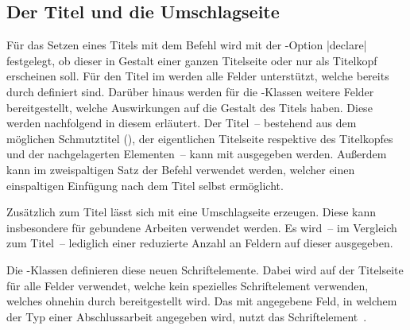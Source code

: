 \begin{Declaration*}{}
\begin{Declaration*}{}
\begin{Declaration*}{}
\subsection{Der Titel und die Umschlagseite}
%
%
%
%
%
Für das Setzen eines Titels mit dem Befehl  wird mit der 
\KOMAScript-Option |declare| festgelegt, ob dieser 
in Gestalt einer ganzen Titelseite oder nur als Titelkopf erscheinen soll. Für 
den Titel im \TUDCD werden alle Felder unterstützt, welche bereits durch 
\KOMAScript{} definiert sind. Darüber hinaus werden für die \TUDScript-Klassen 
weitere Felder bereitgestellt, welche Auswirkungen auf die Gestalt des Titels 
haben. Diese werden nachfolgend in diesem \autorefname erläutert. Der Titel~-- 
bestehend aus dem möglichen Schmutztitel (), der eigentlichen 
Titelseite respektive des Titelkopfes und der nachgelagerten Elementen~-- kann 
mit  ausgegeben werden. Außerdem kann im zweispaltigen Satz 
der Befehl  verwendet werden, welcher einen 
einspaltigen Einfügung nach dem Titel selbst ermöglicht.

Zusätzlich zum Titel lässt sich mit  eine Umschlagseite 
erzeugen. Diese kann insbesondere für gebundene Arbeiten verwendet werden. Es 
wird~-- im Vergleich zum Titel~-- lediglich einer reduzierte Anzahl an Feldern 
auf dieser ausgegeben.

\begin{Declaration}[v2.02]{}
\begin{Declaration}[v2.02]{}
\printdeclarationlist%
%
%
Die \TUDScript-Klassen definieren diese neuen Schriftelemente. Dabei wird 
 auf der Titelseite für alle Felder verwendet, welche kein 
spezielles Schriftelement verwenden, welches ohnehin durch \KOMAScript{} 
bereitgestellt wird. Das mit  angegebene Feld, in welchem der Typ 
einer Abschlussarbeit angegeben wird, nutzt das Schriftelement~. 


\end{Declaration}
\end{Declaration}
\end{Declaration*}
\end{Declaration*}
\end{Declaration*}
